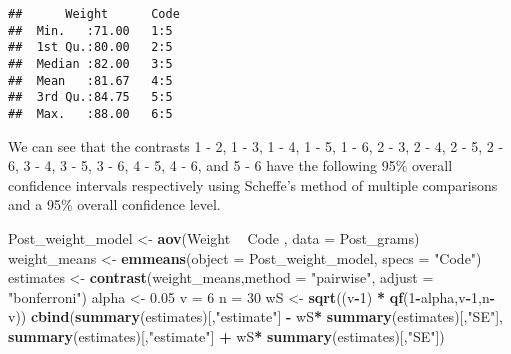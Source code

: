\documentclass[12pt,]{article}
\newenvironment{Shaded}{\begin{snugshade}}{\end{snugshade}}
\newcommand{\KeywordTok}[1]{\textcolor[rgb]{0.13,0.29,0.53}{\textbf{#1}}}
\newcommand{\DataTypeTok}[1]{\textcolor[rgb]{0.13,0.29,0.53}{#1}}
\newcommand{\DecValTok}[1]{\textcolor[rgb]{0.00,0.00,0.81}{#1}}
\newcommand{\FloatTok}[1]{\textcolor[rgb]{0.00,0.00,0.81}{#1}}
\newcommand{\StringTok}[1]{\textcolor[rgb]{0.31,0.60,0.02}{#1}}
\newcommand{\OperatorTok}[1]{\textcolor[rgb]{0.81,0.36,0.00}{\textbf{#1}}}
\newcommand{\NormalTok}[1]{#1}
\begin{document}
\begin{Shaded}
\end{Shaded}

\begin{verbatim}
##      Weight      Code 
##  Min.   :71.00   1:5  
##  1st Qu.:80.00   2:5  
##  Median :82.00   3:5  
##  Mean   :81.67   4:5  
##  3rd Qu.:84.75   5:5  
##  Max.   :88.00   6:5
\end{verbatim}

We can see that the contrasts 1 - 2, 1 - 3, 1 - 4, 1 - 5, 1 - 6, 2 - 3,
2 - 4, 2 - 5, 2 - 6, 3 - 4, 3 - 5, 3 - 6, 4 - 5, 4 - 6, and 5 - 6 have
the following 95\% overall confidence intervals respectively using
Scheffe's method of multiple comparisons and a 95\% overall confidence
level.

\begin{Shaded}
\begin{Highlighting}[]
\NormalTok{Post_weight_model <-}\StringTok{ }\KeywordTok{aov}\NormalTok{(Weight }\OperatorTok{~}\StringTok{ }\NormalTok{Code , }\DataTypeTok{data =}\NormalTok{ Post_grams)}
\NormalTok{weight_means <-}\StringTok{ }\KeywordTok{emmeans}\NormalTok{(}\DataTypeTok{object =}\NormalTok{ Post_weight_model, }\DataTypeTok{specs =} \StringTok{"Code"}\NormalTok{)}
\NormalTok{estimates <-}\StringTok{ }\KeywordTok{contrast}\NormalTok{(weight_means,}\DataTypeTok{method =} \StringTok{"pairwise"}\NormalTok{, }\DataTypeTok{adjust =} \StringTok{"bonferroni"}\NormalTok{)}
\NormalTok{alpha <-}\StringTok{ }\FloatTok{0.05}
\NormalTok{v =}\StringTok{ }\DecValTok{6}
\NormalTok{n =}\StringTok{ }\DecValTok{30}
\NormalTok{wS <-}\StringTok{ }\KeywordTok{sqrt}\NormalTok{((v}\OperatorTok{-}\DecValTok{1}\NormalTok{) }\OperatorTok{*}\StringTok{ }\KeywordTok{qf}\NormalTok{(}\DecValTok{1}\OperatorTok{-}\NormalTok{alpha,v}\OperatorTok{-}\DecValTok{1}\NormalTok{,n}\OperatorTok{-}\NormalTok{v))}
\KeywordTok{cbind}\NormalTok{(}\KeywordTok{summary}\NormalTok{(estimates)[,}\StringTok{"estimate"}\NormalTok{] }\OperatorTok{-}\StringTok{ }\NormalTok{wS}\OperatorTok{*}\StringTok{ }\KeywordTok{summary}\NormalTok{(estimates)[,}\StringTok{"SE"}\NormalTok{],}
      \KeywordTok{summary}\NormalTok{(estimates)[,}\StringTok{"estimate"}\NormalTok{] }\OperatorTok{+}\StringTok{ }\NormalTok{wS}\OperatorTok{*}\StringTok{ }\KeywordTok{summary}\NormalTok{(estimates)[,}\StringTok{"SE"}\NormalTok{])}
\end{Highlighting}
\end{Shaded}
\end{document}
